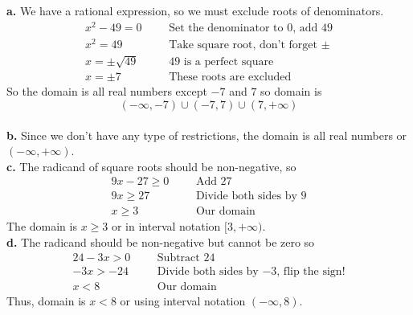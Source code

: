 \textbf{a.} We have a rational expression, so we must exclude roots of denominators. 
\begin{align*}
        x^2-49=0&   &   &\text{Set the denominator to 0, add 49}\\
        x^2=49& &   &\text{Take square root, don't forget $\pm$}\\
        x = \pm \sqrt{49}&  &   &\text{49 is a perfect square}\\
        x = \pm 7&  &   &\text{These roots are excluded}
\end{align*}
So the domain is all real numbers except $-7$ and $7$ so domain is \[(-\infty,-7) \cup (-7,7) \cup (7,+\infty)\]
\\
\textbf{b.} Since we don't have any type of restrictions, the domain is all real numbers or $(-\infty, +\infty)$.
\\[1cm]
\textbf{c.} The radicand of square roots should be non-negative, so
\begin{align*}
        9x - 27 \ge 0 &     &   &\text{Add 27}\\
        9x \ge 27&  &   &\text{Divide both sides by 9}\\
        x \ge 3&    &   &\text{Our domain}
\end{align*}
The domain is $x\ge 3$ or in interval notation $[3,+\infty)$.
\\[1cm]
\textbf{d. } The radicand should be non-negative but cannot be zero so
\begin{align*}
        24-3x > 0&  &   &   \text{Subtract 24}\\
        -3x > -24&  &   &\text{Divide both sides by $-3$, flip the sign!}\\
        x < 8&  &   &\text{Our domain}
\end{align*}
Thus, domain is $x < 8$ or using interval notation $(-\infty,8)$.
